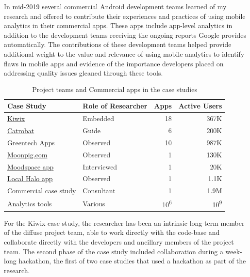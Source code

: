 In mid-2019 several commercial Android development teams learned of my research and offered to contribute their experiences and practices of using mobile analytics in their commercial apps. These apps include app-level analytics in addition to the development teams receiving the ongoing reports Google provides automatically. The contributions of these development teams helped provide additional weight to the value and relevance of using mobile analytics to identify flaws in mobile apps and evidence of the importance developers placed on addressing quality issues gleaned through these tools.


\begin{table}[htbp!]
    \centering
    \small
    \setlength{\tabcolsep}{4pt} %
    \begin{tabular}{llrr}
      Case Study &Role of Researcher &Apps &Active Users\\
      \hline
       \href{https://play.google.com/store/apps/dev?id=9116215767541857492&hl=en_GB}{Kiwix}  &Embedded &18 &367K\\
       \href{https://play.google.com/store/apps/developer?id=Catrobat&hl=en_GB}{Catrobat} &Guide &6 &200K\\
       \href{https://play.google.com/store/apps/dev?id=7665838187257770408}{Greentech Apps} &Observed &10 &987K\\
       \href{https://play.google.com/store/apps/developer?id=Moonpig.com&hl=en_GB}{Moonpig.com} &Observed &1 &130K\\
       \href{https://play.google.com/store/apps/details?id=boundless.moodgym&hl=en_GB}{Moodspace app} &Interviewed &1 &20K\\
       \href{https://play.google.com/store/apps/details?id=com.localhalo.app&hl=en_GB}{Local Halo app} &Observed &1 &1.1K\\
       Commercial case study &Consultant &1 &1.9M\\
       Analytics tools &Various &10\textsuperscript{6} &10\textsuperscript{9} \\
    \end{tabular}
    \caption{Project teams and Commercial apps in the case studies}
    \label{tab:case_studies}
\end{table}

For the Kiwix case study, the researcher has been an intrinsic long-term member of the diffuse project team, able to work directly with the code-base and collaborate directly with the developers and ancillary members of the project team. The second phase of the case study included collaboration during a week-long hackathon, the first of two case studies that used a hackathon as part of the research. 

